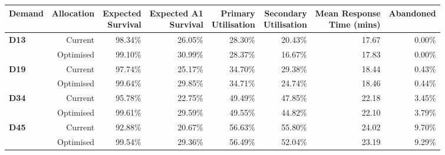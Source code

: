 \begin{tabular}{lrrrrrrr}
\toprule
Demand & Allocation & \specialcellr{Expected\\Survival} & \specialcellr{Expected A1\\Survival} & \specialcellr{Primary\\Utilisation} & \specialcellr{Secondary\\Utilisation} & \specialcellr{Mean Response\\Time (mins)} & Abandoned \\
\midrule
\multirow{2}{*}{\textbf{D13}} & Current   & 98.34\% & 26.05\% & 28.30\% & 20.43\% & 17.67 & 0.00\% \\
                              & Optimised & 99.10\% & 30.99\% & 28.37\% & 16.67\% & 17.83 & 0.00\% \\
\midrule
\multirow{2}{*}{\textbf{D19}} & Current   & 97.74\% & 25.17\% & 34.70\% & 29.38\% & 18.44 & 0.43\% \\
                              & Optimised & 99.64\% & 29.85\% & 34.71\% & 24.74\% & 18.46 & 0.44\% \\
\midrule
\multirow{2}{*}{\textbf{D34}} & Current   & 95.78\% & 22.75\% & 49.49\% & 47.85\% & 22.18 & 3.45\% \\
                              & Optimised & 99.61\% & 29.59\% & 49.55\% & 44.82\% & 22.10 & 3.79\% \\
\midrule
\multirow{2}{*}{\textbf{D45}} & Current   & 92.88\% & 20.67\% & 56.63\% & 55.80\% & 24.02 & 9.70\% \\
                              & Optimised & 99.54\% & 29.36\% & 56.49\% & 52.04\% & 23.19 & 9.29\% \\
\bottomrule
\end{tabular}